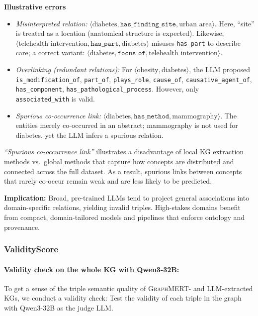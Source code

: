 \documentclass[10pt]{article}
\newcommand{\ours}{\textsc{GraphMERT}\xspace}
\begin{document}
\noindent\textbf{Illustrative errors}
\begin{itemize}
  \item \emph{Misinterpreted relation:}
  $\langle\text{diabetes}, \texttt{has\_finding\_site}, \text{urban area}\rangle$.
  Here, ``site'' is treated as a location (anatomical structure is expected).
  Likewise, $\langle\text{telehealth intervention}, \texttt{has\_part}, \text{diabetes}\rangle$ misuses \texttt{has\_part} to describe care; a correct variant:
  $\langle\text{diabetes}, \texttt{focus\_of}, \text{telehealth intervention}\rangle$.
  \item \emph{Overlinking (redundant relations):}
  For $\langle\text{obesity}, \text{diabetes}\rangle$, the LLM proposed
  \texttt{is\_modification\_of}, \texttt{part\_of}, \texttt{plays\_role}, \texttt{cause\_of},
  \texttt{causative\_agent\_of}, \texttt{has\_component}, \texttt{has\_pathological\_process}.
  However, only \texttt{associated\_with} is valid.
  \item \emph{Spurious co-occurrence link:}
  $\langle\text{diabetes}, \texttt{has\_method}, \text{mammography}\rangle$.
  The entities merely co-occurred in an abstract; mammography is not used for diabetes, yet the LLM infers a spurious relation. 
\end{itemize}

\emph{``Spurious co-occurrence link''} illustrates a disadvantage of local KG extraction methods vs.~global methods that capture how concepts are distributed and connected across the full dataset. As a result, spurious links between concepts that rarely co-occur remain weak and are less likely to be predicted. 

\noindent\textbf{Implication:}
Broad, pre-trained LLMs tend to project general associations into domain-specific relations, yielding invalid triples. High-stakes domains benefit from compact, domain-tailored models and pipelines that enforce ontology and provenance.

\subsubsection{ValidityScore}
\label{subsubsec:validity_check}

\paragraph{Validity check on the whole KG with Qwen3-32B:} To get a sense of the triple semantic quality of \ours- and LLM-extracted KGs, we conduct a validity check: Test the validity of each triple in the graph with Qwen3-32B as the judge LLM.
\end{document}
